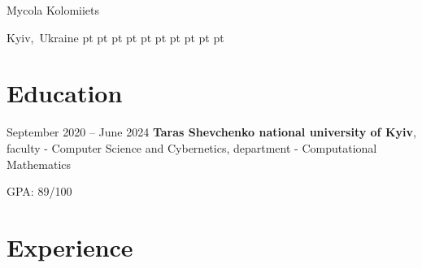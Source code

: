 \documentclass[10pt, letterpaper]{article}
\begin{document}
    \newsavebox\ANDbox
    \sbox\ANDbox{$|$}

    \begin{header}
        \fontsize{25 pt}{25 pt}\selectfont Mycola Kolomiiets

        \vspace{5 pt}

        \normalsize
        \mbox{Kyiv, Ukraine}%
         pt%
        \AND%
         pt%
        \mbox{}%
         pt%
        \AND%
         pt%
        \mbox{}%
         pt%
        \AND%
         pt%
        \mbox{}%
         pt%
        \AND%
         pt%
        \mbox{}%
         pt%
        \AND%
         pt%
        \mbox{}%
    \end{header}

    \vspace{5 pt - 0.3 cm}

    \section{Education}
        
        \begin{twocolentry}{
            September 2020 – June 2024
        }
            \textbf{Taras Shevchenko national university of Kyiv}, 
            faculty - Computer Science and Cybernetics, department - Computational Mathematics
        \end{twocolentry}

        \vspace{0.10 cm}
        \begin{onecolentry}
            \begin{highlights}
                \item GPA: 89/100
            \end{highlights}
        \end{onecolentry}



    
    \section{Experience}
\end{document}
